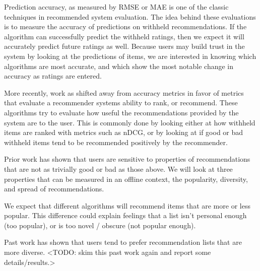 \documentclass[letterpaper]{sig-alternate}
\begin{document}


      

  Prediction accuracy, as measured by RMSE or MAE is one of the classic techniques in recommended system evaluation.
  The idea behind these evaluations is to measure the accuracy of predictions on withheld recommendations.
  If the algorithm can successfully predict the withheld ratings, then we expect it will accurately predict future ratings as well.
  Because users may build trust in the system by looking at the predictions of items, we are interested in knowing which algorithms are most accurate, and which show the most notable change in accuracy as ratings are entered.
  
  More recently, work as shifted away from accuracy metrics in favor of metrics that evaluate a recommender systems ability to rank, or recommend.
  These algorithms try to evaluate how useful the recommendations provided by the system are to the user.
  This is commonly done by looking either at how withheld items are ranked with metrics such as nDCG, or by looking at if good or bad withheld items tend to be recommended positively by the recommender.
  
  Prior work \cite{ziegler and martijn} has shown that users are sensitive to properties of recommendations that are not as trivially good or bad as those above.
  We will look at three properties that can be measured in an offline context, the popularity, diversity, and spread of recommendations.

  We expect that different algorithms will recommend items that are more or less popular.
  This difference could explain feelings that a list isn't personal enough (too popular), or is too novel / obscure (not popular enough).

  Past work \cite{ziegler and martijn} has shown that users tend to prefer recommendation lists that are more diverse.
  <TODO: skim this past work again and report some details/results.>
\end{document}

